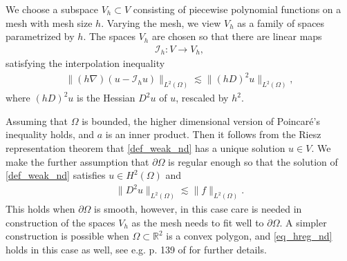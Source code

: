 \documentclass[12pt,oneside,final]{amsart}
\def\p{\partial}
\def\R{\mathbb R}
\def\I{\mathcal I}
\begin{document}
We choose a subspace $V_h \subset V$ consisting of piecewise polynomial functions on a mesh with mesh size $h$. Varying the mesh, we view $V_h$ as a family of spaces parametrized by $h$. The spaces $V_h$ are chosen so that there are linear maps
    \begin{align*}
\I_h : V \to V_h,
    \end{align*}  
satisfying the interpolation inequality 
    \begin{align}\label{eq_interp_nd}
\|(h\nabla)(u - \I_h u)\|_{L^2(\Omega)} \lesssim \|(hD)^2 u\|_{L^2(\Omega)},
    \end{align}
where $(hD)^2 u$ is the Hessian $D^2 u$ of $u$, rescaled by $h^2$.

Assuming that $\Omega$ is bounded, the higher dimensional version of Poincar\'e's inequality holds, and $a$ is an inner product. Then it follows from the Riesz representation theorem that 
\eqref{def_weak_nd} has a unique solution $u \in V$.
We make the further assumption that $\p \Omega$ is regular enough so that the solution of \eqref{def_weak_nd} satisfies $u \in H^2(\Omega)$ and 
    \begin{align}\label{eq_hreg_nd}
\|D^2 u\|_{L^2(\Omega)} \lesssim \|f\|_{L^2(\Omega)}.
    \end{align}
This holds when $\p \Omega$ is smooth, however, in this case care is needed in construction of the spaces $V_h$ as the mesh needs to fit well to $\p \Omega$. A simpler construction is possible when $\Omega \subset \R^2$ is a convex polygon, and \eqref{eq_hreg_nd} holds in this case as well, see e.g. p. 139 of \cite{BS} for further details. 
\end{document}
